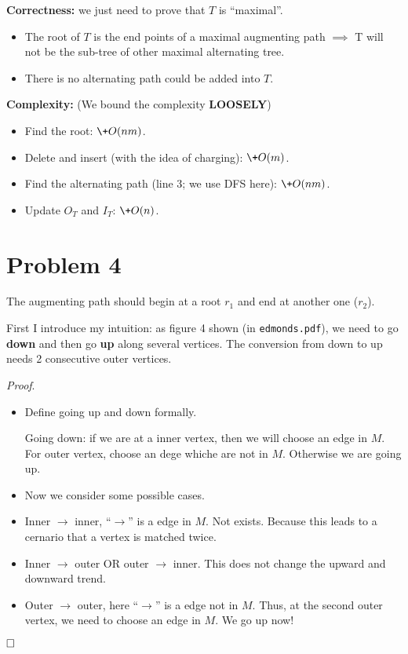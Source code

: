 \documentclass{article}
\begin{document}
\textbf{Correctness:} we just need to prove that $T$ is ``maximal''.
\begin{itemize}
	\item 
		The root of $T$ is the end points of a  maximal augmenting path $\implies$ T will not be the sub-tree of other maximal alternating tree.
	\item 
		There is no alternating path could be added into $T$.
\end{itemize}

\textbf{Complexity:} (We bound the complexity \textbf{LOOSELY})
\begin{itemize}
	\item 
		Find the root: $\+O(nm)$.
	\item
		Delete and insert (with the idea of charging): $\+O(m)$.
	\item
		Find the alternating path (line 3; we use DFS here): $\+O(nm)$.
	\item
		Update $O_T$ and  $I_T$:  $\+O(n)$.
\end{itemize}

\section*{Problem 4}
The augmenting path should begin at a root $r_1$ and end at another one ($r_2$).

First I introduce my intuition: as figure 4 shown (in \texttt{edmonds.pdf}), we need to go \textbf{down} and then go \textbf{up} along several vertices. The conversion from down to up needs 2 consecutive outer vertices.

\textit{Proof}.
\begin{itemize}
	\item Define going up and down formally. 

		Going down: if we are at a inner vertex, then we will choose an edge in $M$. For outer vertex, choose an dege whiche are not in $M$. Otherwise we are going up.
	\item
		Now we consider some possible cases.
	\item
		Inner $\to$ inner, ``$\to$'' is a edge in $M$. Not exists. Because this leads to a cernario that a vertex is matched twice.
	\item
		Inner $\to$ outer OR outer $\to$ inner. This does not change the upward and downward trend.
	\item
		Outer $\to$ outer, here ``$\to$'' is a edge not in $M$. Thus, at the second outer vertex, we need to choose an edge in $M$. We go up now!
\end{itemize}
$\hfill\square$
\end{document}
